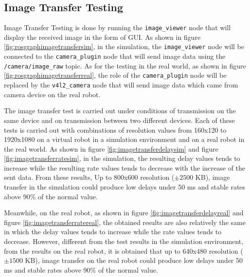 \subsection{Image Transfer Testing}
\label{subsec:imagetransfertesting}




Image Transfer Testing is done by running the \lstinline{image_viewer} node that will display the received image in the form of GUI.
As shown in figure \ref{fig:rosgraphimagetransfersim},
  in the simulation,
  the \lstinline{image_viewer} node will be connected to the \lstinline{camera_plugin} node that will send image data using the \lstinline{/camera/image_raw} topic.
As for the testing in the real world,
  as shown in figure \ref{fig:rosgraphimagetransferreal},
  the role of the \lstinline{camera_plugin} node will be replaced by the \lstinline{v4l2_camera} node that will send image data which came from camera device on the real robot.




The image transfer test is carried out under conditions of transmission on the same device and on transmission between two different devices.
Each of these tests is carried out with combinations of resolution values from 160x120 to 1920x1080 on a virtual robot in a simulation environment and on a real robot in the real world.
As shown in figure \ref{fig:imagetransferdelaysim} and figure \ref{fig:imagetransferratesim},
  in the simulation,
  the resulting delay values tends to increase while the resulting rate values tends to decrease with the increase of the sent data.
From these results,
  Up to 800x600 resolution ($\pm2500$ KB),
  image transfer in the simulation could produce low delays under 50 ms and stable rates above 90\% of the normal value.




Meanwhile,
  on the real robot,
  as shown in figure \ref{fig:imagetransferdelayreal} and figure \ref{fig:imagetransferratereal},
  the obtained results are also relatively the same in which the delay values tends to increase while the rate values tends to decrease.
However,
  different from the test results in the simulation environment,
  from the results on the real robot,
  it is obtained that up to 640x480 resolution ($\pm1500$ KB),
  image transfer on the real robot could produce low delays under 50 ms and stable rates above 90\% of the normal value.
